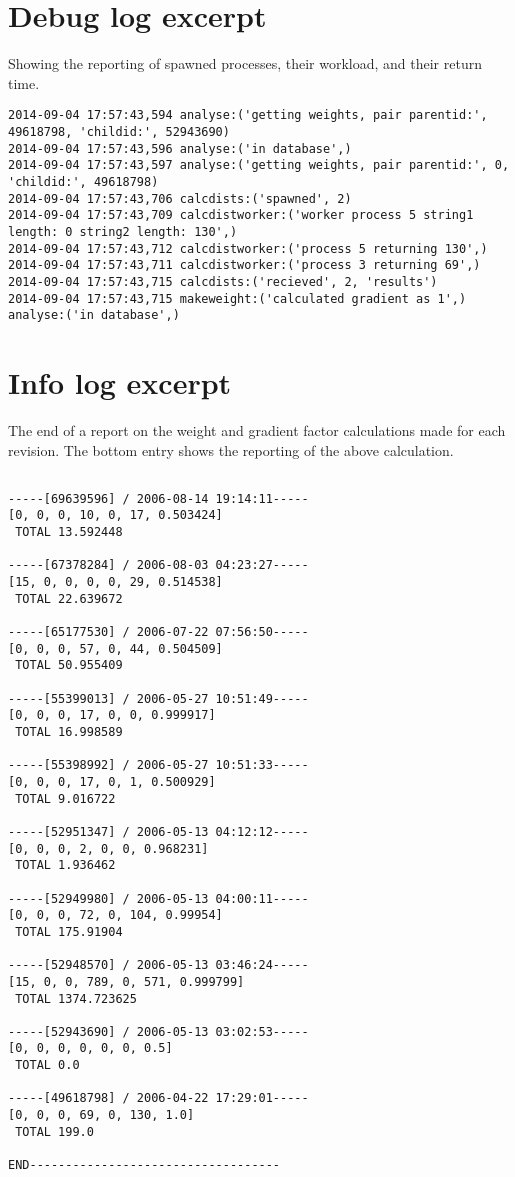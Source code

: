 \section{Debug log excerpt}
Showing the reporting of spawned processes, their workload, and their
return time.

\begin{verbatim}
2014-09-04 17:57:43,594 analyse:('getting weights, pair parentid:', 49618798, 'childid:', 52943690)
2014-09-04 17:57:43,596 analyse:('in database',)
2014-09-04 17:57:43,597 analyse:('getting weights, pair parentid:', 0, 'childid:', 49618798)
2014-09-04 17:57:43,706 calcdists:('spawned', 2)
2014-09-04 17:57:43,709 calcdistworker:('worker process 5 string1 length: 0 string2 length: 130',)
2014-09-04 17:57:43,712 calcdistworker:('process 5 returning 130',)
2014-09-04 17:57:43,711 calcdistworker:('process 3 returning 69',)
2014-09-04 17:57:43,715 calcdists:('recieved', 2, 'results')
2014-09-04 17:57:43,715 makeweight:('calculated gradient as 1',)
analyse:('in database',)
\end{verbatim}

\section{Info log excerpt}
The end of a report on the weight and gradient factor calculations
made for each revision. The bottom entry shows the reporting of the
above calculation.

\begin{verbatim}

-----[69639596] / 2006-08-14 19:14:11-----
[0, 0, 0, 10, 0, 17, 0.503424]
 TOTAL 13.592448
 
-----[67378284] / 2006-08-03 04:23:27-----
[15, 0, 0, 0, 0, 29, 0.514538]
 TOTAL 22.639672
 
-----[65177530] / 2006-07-22 07:56:50-----
[0, 0, 0, 57, 0, 44, 0.504509]
 TOTAL 50.955409
 
-----[55399013] / 2006-05-27 10:51:49-----
[0, 0, 0, 17, 0, 0, 0.999917]
 TOTAL 16.998589
 
-----[55398992] / 2006-05-27 10:51:33-----
[0, 0, 0, 17, 0, 1, 0.500929]
 TOTAL 9.016722
 
-----[52951347] / 2006-05-13 04:12:12-----
[0, 0, 0, 2, 0, 0, 0.968231]
 TOTAL 1.936462
 
-----[52949980] / 2006-05-13 04:00:11-----
[0, 0, 0, 72, 0, 104, 0.99954]
 TOTAL 175.91904
 
-----[52948570] / 2006-05-13 03:46:24-----
[15, 0, 0, 789, 0, 571, 0.999799]
 TOTAL 1374.723625
 
-----[52943690] / 2006-05-13 03:02:53-----
[0, 0, 0, 0, 0, 0, 0.5]
 TOTAL 0.0
 
-----[49618798] / 2006-04-22 17:29:01-----
[0, 0, 0, 69, 0, 130, 1.0]
 TOTAL 199.0
 
END-----------------------------------
\end{verbatim}
